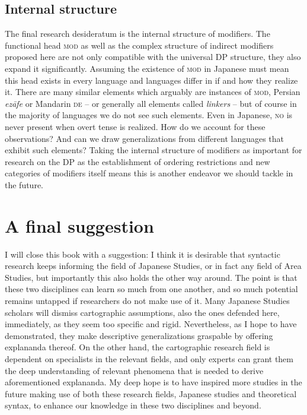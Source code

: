 \documentclass [output=book,colorlinks,citecolor=brown]{langscibook}
\begin{document}
\subsection{Internal structure}

The final research desideratum is the internal structure of modifiers. The functional head \textsc{mod} as well as the complex structure of indirect modifiers proposed here are not only compatible with the universal DP structure, they also expand it significantly. Assuming the existence of \textsc{mod} in Japanese must mean this head exists in every language and languages differ in if and how they realize it. There are many similar elements which arguably are instances of \textsc{mod}, Persian \textit{ezāfe} or Mandarin \textsc{de} -- or generally all elements called \textit{linkers} \citep{richards:2023:finding} -- but of course in the majority of languages we do not see such elements. Even in Japanese, \textsc{no} is never present when overt tense is realized. How do we account for these observations? And can we draw generalizations from different languages that exhibit such elements? Taking the internal structure of modifiers as important for research on the DP as the establishment of ordering restrictions and new categories of modifiers itself means this is another endeavor we should tackle in the future.

\section{A final suggestion}

I will close this book with a suggestion: I think it is desirable that syntactic research keeps informing the field of Japanese Studies, or in fact any field of Area Studies, but importantly this also holds the other way around. The point is that these two disciplines can learn so much from one another, and so much potential remains untapped if researchers do not make use of it. Many Japanese Studies scholars will dismiss cartographic assumptions, also the ones defended here, immediately, as they seem too specific and rigid. Nevertheless, as I hope to have demonstrated, they make descriptive generalizations graspable by offering explananda thereof. On the other hand, the cartographic research field is dependent on specialists in the relevant fields, and only experts can grant them the deep understanding of relevant phenomena that is needed to derive aforementioned explananda. My deep hope is to have inspired more studies in the future making use of both these research fields, Japanese studies and theoretical syntax, to enhance our knowledge in these two disciplines and beyond.
\end{document}
